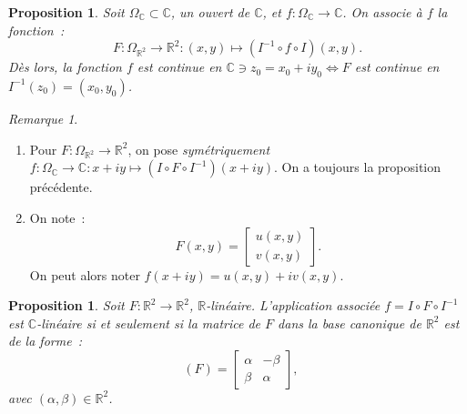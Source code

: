 \documentclass{report}
\newtheorem{prp}[thm]{Proposition}
\theoremstyle{definition}
\theoremstyle{remark}
\newtheorem*{rmq}{Remarque}
\numberwithin{equation}{section}
\newcommand{\C}{\mathbb C}
\newcommand{\R}{\mathbb R}
\DeclareMathOperator{\Mat}{Mat}
\DeclareMathOperator{\MatBC}{\Mat_{B_C}}
\begin{document}
			\begin{prp} Soit $\Omega_\C \subset \C$, un ouvert de $\C$, et $f : \Omega_\C \to \C$. On associe à $f$ la fonction~:
			\begin{equation}
				F : \Omega_{\R^2} \to \R^2 : (x, y) \mapsto (I^{-1} \circ f \circ I)(x, y).
			\end{equation}
			Dès lors, la fonction $f$ est continue en $\C \ni z_0 = x_0 + iy_0 \iff F$ est continue en $I^{-1}(z_0) = (x_0, y_0)$.
			\end{prp}

			\begin{rmq}~
				\begin{enumerate}
					\item Pour $F : \Omega_{\R^2} \to \R^2$, on pose \textit{symétriquement} $f : \Omega_\C \to \C : x+iy \mapsto (I \circ F \circ I^{-1})(x+iy)$. On
					a toujours la proposition précédente.
					\item On note~:
					\begin{equation}
						F(x, y) = \begin{bmatrix}u(x, y) \\v(x, y)\end{bmatrix}.
					\end{equation}
					On peut alors noter $f(x+iy) = u(x, y) + iv(x, y)$.
				\end{enumerate}
			\end{rmq}

			\begin{prp} Soit $F : \R^2 \to \R^2$, $\R$-linéaire. L'application associée $f = I \circ F \circ I^{-1}$ est $\C$-linéaire si et seulement si la matrice
			de $F$ dans la base canonique de $\R^2$ est de la forme~:
			\begin{equation}\label{eq:C-linéaire -> matrice rotation}
				\MatBC(F) = \begin{bmatrix}\alpha & -\beta \\\beta & \alpha\end{bmatrix},
			\end{equation}
			avec $(\alpha, \beta) \in \R^2$.
			\end{prp}
\end{document}
